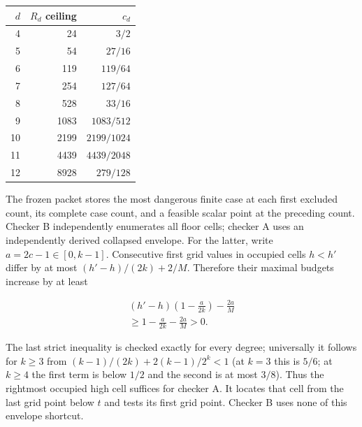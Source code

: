 \documentclass[11pt]{article}
\theoremstyle{remark}
\theoremstyle{correctionstyle}
\begin{document}
\begin{center}
\begin{tabular}{rrr}
\toprule
$d$ & $R_d$ ceiling & $c_d$\\
\midrule
4 & 24 & $3/2$\\
5 & 54 & $27/16$\\
6 & 119 & $119/64$\\
7 & 254 & $127/64$\\
8 & 528 & $33/16$\\
9 & 1083 & $1083/512$\\
10 & 2199 & $2199/1024$\\
11 & 4439 & $4439/2048$\\
12 & 8928 & $279/128$\\
\bottomrule
\end{tabular}
\label{src-p064}\label{src-end-p064}
\end{center}

\leavevmode\label{src-p065}The frozen packet stores the most dangerous finite case at each first
excluded count, its complete case count, and a feasible scalar point at
the preceding count. Checker B independently enumerates all floor cells;
checker A uses an independently derived collapsed envelope. For the latter,
write $a=2c-1\in[0,k-1]$. Consecutive first grid values in occupied cells
$h<h'$ differ by at most $(h'-h)/(2k)+2/M$. Therefore their maximal budgets
increase by at least\label{src-end-p065}\par

\begin{equation}
\begin{aligned}(h'-h)\left(1-\frac a{2k}\right)-\frac{2a}{M}\\\ge1-\frac a{2k}-\frac{2a}{M}>0.\end{aligned}\tag*{}
\label{src-p066}
\end{equation}

\leavevmode\label{src-p067}The last strict inequality is checked exactly for every degree; universally
it follows for $k\ge3$ from $(k-1)/(2k)+2(k-1)/2^k<1$ (at $k=3$ this is $5/6$;
at $k\ge4$ the first term is below $1/2$ and the second is at most $3/8$).
Thus the rightmost occupied high cell suffices for checker A. It locates
that cell from the last grid point below $t$ and tests its first grid point.
Checker B uses none of this envelope shortcut.\label{src-end-p067}\par
\end{document}
